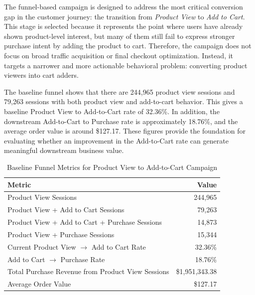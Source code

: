 \documentclass[conference]{IEEEtran}
\begin{document}
The funnel-based campaign is designed to address the most critical conversion gap in the customer journey: the transition from \textit{Product View} to \textit{Add to Cart}. This stage is selected because it represents the point where users have already shown product-level interest, but many of them still fail to express stronger purchase intent by adding the product to cart. Therefore, the campaign does not focus on broad traffic acquisition or final checkout optimization. Instead, it targets a narrower and more actionable behavioral problem: converting product viewers into cart adders.

The baseline funnel shows that there are 244,965 product view sessions and 79,263 sessions with both product view and add-to-cart behavior. This gives a baseline Product View to Add-to-Cart rate of 32.36\%. In addition, the downstream Add-to-Cart to Purchase rate is approximately 18.76\%, and the average order value is around \$127.17. These figures provide the foundation for evaluating whether an improvement in the Add-to-Cart rate can generate meaningful downstream business value.

\begin{table}[H]
\centering
\caption{Baseline Funnel Metrics for Product View to Add-to-Cart Campaign}
\label{tab:funnel_baseline_metrics}

\renewcommand{\arraystretch}{1.25}
\setlength{\tabcolsep}{5pt}
\footnotesize

\begin{tabular}{|l|r|}
\toprule
\textbf{Metric} & \textbf{Value} \\
\midrule
Product View Sessions & 244,965 \\
Product View + Add to Cart Sessions & 79,263 \\
Product View + Add to Cart + Purchase Sessions & 14,873 \\
Product View + Purchase Sessions & 15,344 \\
Current Product View $\rightarrow$ Add to Cart Rate & 32.36\% \\
Add to Cart $\rightarrow$ Purchase Rate & 18.76\% \\
Total Purchase Revenue from Product View Sessions & \$1,951,343.38 \\
Average Order Value & \$127.17 \\
\bottomrule
\end{tabular}
\end{table}
\end{document}
